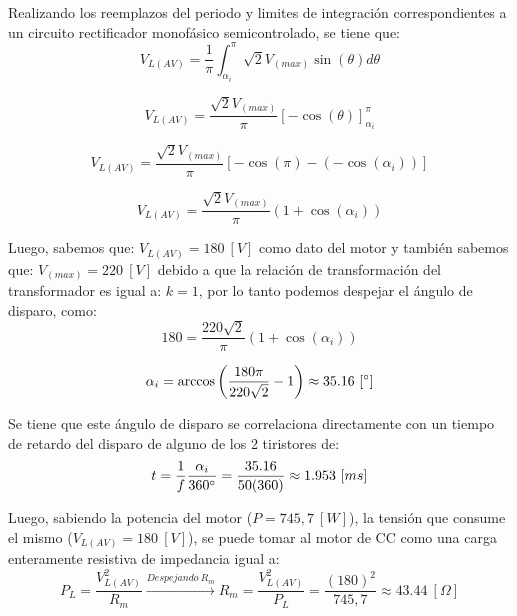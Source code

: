 \documentclass[12pt,a4paper]{article}
\begin{document}
Realizando los reemplazos del periodo y limites de integración correspondientes a un circuito rectificador monofásico semicontrolado, se tiene que:
\begin{equation}
    V_{L(AV)} = \frac{1}{\pi} \int_{\alpha_{i}}^{\pi} \sqrt{2} V_{(max)}\sin(\theta) d\theta
    \label{eq_2}
\end{equation}

\begin{equation}
    V_{L(AV)} = \frac{\sqrt{2} V_{(max)}}{\pi} [-\cos(\theta)]_{\alpha_{i}}^{\pi}
    \label{eq_3}
\end{equation}

\begin{equation}
    V_{L(AV)} = \frac{\sqrt{2} V_{(max)}}{\pi} [-\cos(\pi) - (-\cos(\alpha_{i}))]
    \label{eq_4}
\end{equation}

\begin{equation}
    V_{L(AV)} = \frac{\sqrt{2} V_{(max)}}{\pi} (1 + \cos(\alpha_{i}))
    \label{eq_5}
\end{equation}

Luego, sabemos que: $V_{L(AV)} = 180 \ [V]$ como dato del motor y también sabemos que: $V_{(max)} = 220 \ [V]$ debido a que la relación de transformación del transformador es igual a: $k = 1$, por lo tanto podemos despejar el ángulo de disparo, como:
\begin{equation}
    180 = \frac{220\sqrt{2}}{\pi} (1 + \cos(\alpha_{i}))
    \label{eq_6}
\end{equation}

\begin{equation}
   \alpha_{i} = \arccos \left(\frac{180 \pi}{220\sqrt{2}} - 1\right) \approx 35.16 \ [\degree]
    \label{eq_7}
\end{equation}

Se tiene que este ángulo de disparo se correlaciona directamente con un tiempo de retardo del disparo de alguno de los 2 tiristores de:
\begin{equation}
    t = \frac{1}{f} \frac{\alpha_{i}}{360 \degree} = \frac{35.16}{50(360)} \approx 1.953 \ [ms]
    \label{eq_8}
\end{equation}

Luego, sabiendo la potencia del motor ($P = 745,7 \ [W]$), la tensión que consume el mismo ($V_{L(AV)} = 180 \ [V]$), se puede tomar al motor de CC como una carga enteramente resistiva de impedancia igual a:
\begin{equation}
    P_{L} = \frac{V_{L(AV)}^{2}}{R_{m}} \xrightarrow{Despejando \ R_{m}} R_{m} = \frac{V_{L(AV)}^{2}}{P_{L}} = \frac{(180)^{2}}{745,7} \approx 43.44 \ [\Omega]
    \label{eq_9}
\end{equation}
\end{document}
